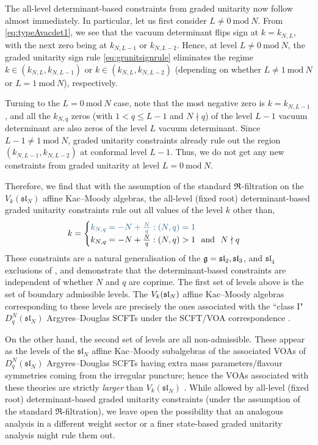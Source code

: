 The all-level determinant-based constraints from graded unitarity now follow almost immediately. In particular, let us first consider $L \neq 0~\mathrm{mod}~N$. From \eqref{eq:typeAvacdet1}, we see that the vacuum determinant flips sign at $k = k_{N,L}$, with the next zero being at $k_{N,L-1}$ or $k_{N,L-2}$. Hence, at level $L \neq 0~\mathrm{mod}~N$, the graded unitarity sign rule \eqref{eq:grunitsignrule} eliminates the regime $k \in (k_{N,L}, k_{N,L-1})$ or $k \in (k_{N,L}, k_{N,L-2})$ (depending on whether $L \neq 1~\mathrm{mod}~N$ or $L = 1~\mathrm{mod}~N$), respectively. 

Turning to the $L = 0~\mathrm{mod}~N$ case, note that the most negative zero is $k = k_{N,L-1}$, and all the $k_{N,q}$ zeros (with $1 < q \leqslant L-1$ and $N \nmid q$) of the level $L-1$ vacuum determinant are also zeros of the level $L$ vacuum determinant. Since $L-1 \neq 1~\mathrm{mod}~N$, graded unitarity constraints already rule out the region $(k_{N,L-1}, k_{N,L-2})$ at conformal level $L-1$. Thus, we do not get any new constraints from graded unitarity at level $L = 0~\mathrm{mod}~N$. 

Therefore, we find that with the assumption of the standard $\mathfrak{R}$-filtration on the $V_k(\mathfrak{sl}_N)$ affine Kac--Moody algebras, the all-level (fixed root) determinant-based graded unitarity constraints rule out all values of the level $k$ other than,
\begin{equation} \label{eq:typeAalllevel}
    k = \begin{cases}
        \textcolor{knownSCFTtext}{k_{N,q} = -N + \frac{N}{q}: (N,q) = 1} \\
        k_{N,q} = -N + \frac{N}{q}: (N,q) > 1 \ \ \mathrm{and} \ \ N \nmid q
    \end{cases}
\end{equation}
These constraints are a natural generalisation of the $\mathfrak{g} = \mathfrak{sl}_2, \mathfrak{sl}_3$, and $\mathfrak{sl}_4$ exclusions of \cite{ArabiArdehali:2025fad}, and demonstrate that the determinant-based constraints are independent of whether $N$ and $q$ are coprime. The first set of levels above is the set of boundary admissible levels. The $V_k(\mathfrak{sl}_N)$ affine Kac--Moody algebras corresponding to these levels are precisely the ones associated with the ``class I" $D_q^N(\mathfrak{sl}_N)$ Argyres--Douglas SCFTs under the SCFT/VOA correspondence \cite{Xie:2016evu, Song:2017oew}. 

On the other hand, the second set of levels are all non-admissible. These appear as the levels of the $\mathfrak{sl}_N$ affine Kac--Moody subalgebras of the associated VOAs of $D_q^N(\mathfrak{sl}_N)$ Argyres--Douglas SCFTs having extra mass parameters/flavour symmetries coming from the irregular puncture; hence the VOAs associated with these theories are strictly \emph{larger} than $V_k(\mathfrak{sl}_N)$ \cite{Xie:2016evu, Song:2017oew, Beem:2023ofp}. While allowed by all-level (fixed root) determinant-based graded unitarity constraints (under the assumption of the standard $\mathfrak{R}$-filtration), we leave open the possibility that an analogous analysis in a different weight sector or a finer state-based graded unitarity analysis might rule them out. 

